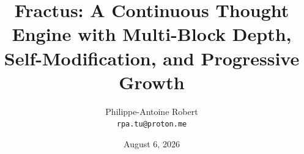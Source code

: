%

\documentclass[11pt,a4paper]{article}
\usepackage[utf8]{inputenc}
\usepackage[margin=1in]{geometry}
\usepackage{amsmath,amssymb}
\usepackage{booktabs}
\usepackage{graphicx}
\usepackage{hyperref}
\usepackage{url}
\usepackage{array}
\usepackage{xcolor}
\usepackage{listings}

\hypersetup{
    colorlinks=true,
    linkcolor=blue!70!black,
    urlcolor=blue!70!black,
    citecolor=blue!70!black,
}

\title{\textbf{Fractus: A Continuous Thought Engine with Multi-Block Depth, \\
       Self-Modification, and Progressive Growth}}
\author{Philippe-Antoine Robert\\
        \texttt{rpa.tu@proton.me}}
\date{August 6, 2026}


\maketitle

\begin{abstract}
I present Fractus v2.0 --- a continuous cognitive agent architecture that departs fundamentally from the transformer paradigm. Unlike static models that map input to output in a single forward pass, Fractus is a dynamical system that maintains a persistent thought state, advances it tick by tick through a multi-block residual stack, and emits output only when it has something confident to say. This version introduces three structural advances: (1) multi-block depth with per-block continuous attention state, (2) progressive growth via zero-padding inheritance, and (3) runtime self-modification. Training optimizations (sparse low-rank MoE, head-partial training, gradient accumulation) achieve 707 tokens/second on a consumer CPU. I also report negative results: Expert Decoupled Training and the Forward-Forward algorithm were both tested and refuted. All code is open-source (MIT).
\end{abstract}

